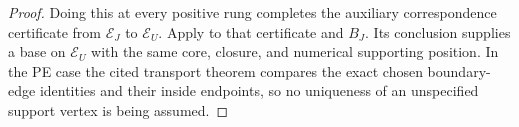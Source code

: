 \begin{proof}
Doing this at every positive rung completes the auxiliary correspondence
certificate from $\mathcal E_J$ to $\mathcal E_U$.  Apply
 to that certificate and
$B_J$.  Its conclusion supplies a base on $\mathcal E_U$ with the same
core, closure, and numerical supporting position.  In the PE case the
cited transport theorem compares the exact chosen boundary-edge identities
and their inside endpoints, so no uniqueness of an unspecified support
vertex is being assumed.
\end{proof}
